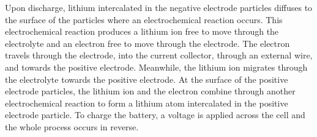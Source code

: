 \documentclass[a4paper]{article}
\begin{document}
Upon discharge, lithium intercalated in the negative electrode particles diffuses to the surface of the particles where an  electrochemical reaction occurs. This electrochemical reaction produces a lithium ion free to move through the electrolyte and an electron free to move through the electrode. The electron travels through the electrode, into the current collector, through an external wire, and towards the positive electrode. Meanwhile, the lithium ion migrates through the electrolyte towards the positive electrode. At the surface of the positive electrode particles, the lithium ion and the electron combine through another electrochemical reaction to form a lithium atom intercalated in the positive electrode particle. To charge the battery, a voltage is applied across the cell and the whole process occurs in reverse.
\end{document}
